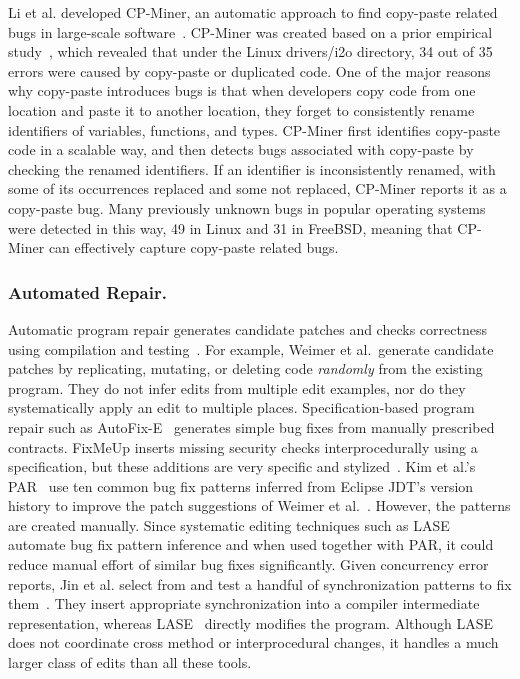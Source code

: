 \documentclass[runningheads,a4paper]{llncs}
\begin{document}
Li et al. developed CP-Miner, an automatic approach to find copy-paste related bugs in large-scale software~\cite{Li2006:CPMiner}. CP-Miner was created based on a prior empirical study~\cite{Chou2001:ESO}, which revealed that under the Linux {\sf drivers/i2o} directory, 34 out of 35 errors were caused by copy-paste or duplicated code. 
One of the major reasons why copy-paste introduces bugs is that when developers copy code from one location and paste it to another location, they forget to consistently rename identifiers of variables, functions, and types. CP-Miner first identifies copy-paste code in a scalable way, and then detects bugs associated with copy-paste by checking the renamed identifiers. If an identifier is inconsistently renamed, with some of its occurrences replaced and some not replaced, CP-Miner reports it as a copy-paste bug. Many previously unknown bugs in popular operating systems were detected in this way, 49 in Linux and 31 in FreeBSD, meaning that CP-Miner can effectively capture copy-paste related bugs. 


\subsubsection{Automated Repair.} 

Automatic program repair generates candidate patches and checks correctness using compilation and testing~\cite{Weimer2009:repair}.  For example, Weimer et al.~generate candidate patches by replicating, mutating, or deleting code \emph{randomly} from the existing program. They do not infer edits from multiple edit examples, nor do they systematically apply an edit to multiple places. Specification-based program repair such as AutoFix-E~\cite{Wei:2010:AutoFix-E} generates simple bug fixes from manually prescribed contracts. FixMeUp inserts missing security checks interprocedurally using a specification, but these additions are very specific and stylized~\cite{SMS:13}.  
Kim et al.'s PAR~\cite{Kim2013:PAR} use ten common bug fix patterns inferred from Eclipse JDT's version history to improve the patch suggestions of Weimer et al.~\cite{Weimer2009:repair}. However, the patterns are created manually. Since systematic editing techniques such as LASE automate bug fix pattern inference and when used together with PAR, it could reduce manual effort of similar bug fixes significantly. Given concurrency error reports, Jin et al. select from and test a handful of synchronization patterns to fix them~\cite{JZDLL:12}. They insert appropriate synchronization into a compiler intermediate representation, whereas LASE~\cite{Meng2013:lase} directly modifies the program. Although LASE does not coordinate cross method or interprocedural changes, it handles a much larger class of edits than all these tools. 
\end{document}

